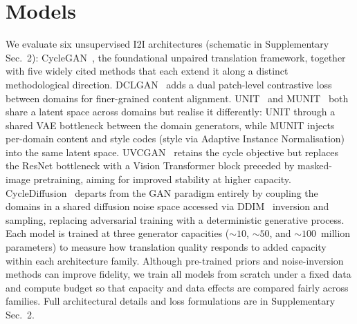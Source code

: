 
\section{Models}
\label{sec:models}

We evaluate six unsupervised I2I architectures (schematic in Supplementary Sec.~2):
CycleGAN~\cite{zhu2017unpaired}, the foundational unpaired translation framework,
together with five widely cited methods that each extend it along a distinct
methodological direction.
DCLGAN~\cite{han2021dual} adds a dual patch-level contrastive loss between domains for
finer-grained content alignment.
UNIT~\cite{liu2017unsupervised} and MUNIT~\cite{huang2018multimodal} both share a latent
space across domains but realise it differently: UNIT through a shared VAE bottleneck between
the domain generators, while MUNIT injects per-domain content and style codes (style via
Adaptive Instance Normalisation) into the same latent space.
UVCGAN~\cite{torbunov2022uvcgan} retains the cycle objective but replaces the ResNet
bottleneck with a Vision Transformer block preceded by masked-image pretraining, aiming
for improved stability at higher capacity.
CycleDiffusion~\cite{wu2022cyclediffusion} departs from the GAN paradigm entirely by
coupling the domains in a shared diffusion noise space accessed via DDIM~\cite{song2021ddim}
inversion and sampling, replacing adversarial training with a deterministic generative
process.
Each model is trained at three generator capacities (${\sim}10$, ${\sim}50$, and
${\sim}100$~million parameters) to measure how translation quality responds to added
capacity within each architecture family.
Although pre-trained priors and noise-inversion methods can improve fidelity, we train
all models from scratch under a fixed data and compute budget so that capacity and data
effects are compared fairly across families.
Full architectural details and loss formulations are in Supplementary Sec.~2.

